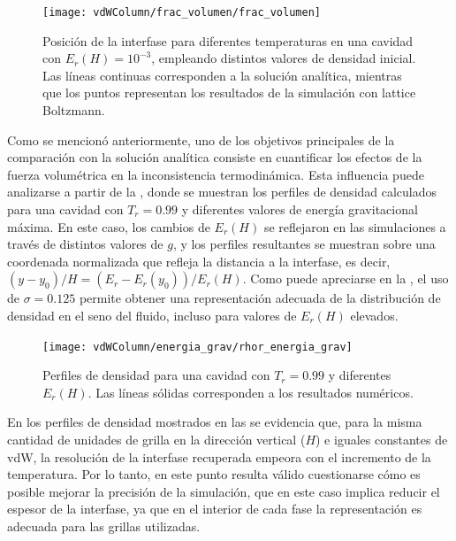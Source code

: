 \begin{figure}[ht]
	\centering
	\texttt{[image: vdWColumn/frac\_volumen/frac\_volumen]}
	\caption{Posici\'on de la interfase  para diferentes temperaturas en una cavidad con $E_r(H)=10^{-3}$, empleando distintos valores de densidad inicial. Las l\'ineas continuas corresponden a la soluci\'on anal\'itica, mientras que los puntos representan  los resultados de la simulaci\'on con lattice Boltzmann.}
	\label{fig:vdWColumn_frac_volumen}
\end{figure}

Como se mencion\'o anteriormente, uno de los objetivos principales de la comparaci\'on con la soluci\'on anal\'itica consiste en cuantificar los efectos de la fuerza volum\'etrica en la inconsistencia termodin\'amica. Esta influencia puede analizarse a partir de la , donde se muestran los perfiles de densidad calculados para una cavidad con $T_r=0.99$ y diferentes valores de energ\'ia gravitacional m\'axima. En este caso, los cambios de $E_r(H)$ se reflejaron en las simulaciones a trav\'es de distintos valores de $g$, y los perfiles resultantes se muestran sobre una coordenada normalizada que refleja la distancia a la interfase, es decir, $(y-y_0)/H = (E_r-E_r(y_0)) / E_r(H)$. Como puede apreciarse en la , el uso de $\sigma=0.125$ permite obtener una representaci\'on adecuada de la distribuci\'on de densidad en el seno del fluido, incluso para valores de $E_r(H)$ elevados.

\begin{figure}[ht]
	\centering
	\texttt{[image: vdWColumn/energia\_grav/rhor\_energia\_grav]}
	\caption{Perfiles de densidad para una cavidad con $T_r = 0.99$ y diferentes $E_r(H)$. Las l\'ineas s\'olidas corresponden a los resultados num\'ericos.}
	\label{fig:vdWColumn_rhor_egrav}
\end{figure}

En los perfiles de densidad mostrados en las  se evidencia que, para la misma cantidad de unidades de grilla en la direcci\'on vertical ($H$) e iguales constantes de vdW, la resoluci\'on de la interfase recuperada empeora con el incremento de la temperatura. Por lo tanto, en este punto resulta v\'alido cuestionarse c\'omo es posible mejorar la precisi\'on de la simulaci\'on, que en este caso implica reducir el espesor de la interfase, ya que en el interior de cada fase la representaci\'on es adecuada para las grillas utilizadas.

